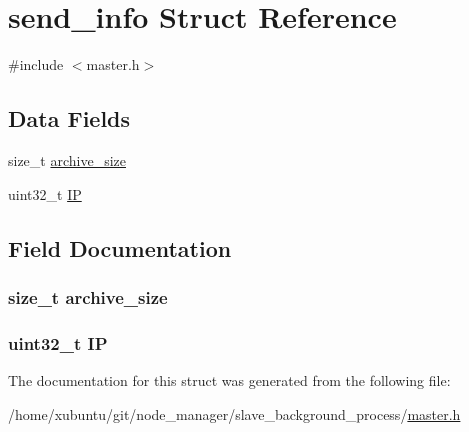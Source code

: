 \hypertarget{structsend__info}{}\section{send\+\_\+info Struct Reference}
\label{structsend__info}


{\ttfamily \#include $<$master.\+h$>$}

\subsection*{Data Fields}
\begin{DoxyCompactItemize}
\item 
size\+\_\+t \hyperlink{structsend__info_ab94e89f3b77835bdc3d4216184a99b60}{archive\+\_\+size}
\item 
uint32\+\_\+t \hyperlink{structsend__info_a7dfc7538cc29332ef7bb54fb8ff72ffc}{I\+P}
\end{DoxyCompactItemize}


\subsection{Field Documentation}
\hypertarget{structsend__info_ab94e89f3b77835bdc3d4216184a99b60}{}
\subsubsection[{archive\+\_\+size}]{\setlength{\rightskip}{0pt plus 5cm}size\+\_\+t archive\+\_\+size}\label{structsend__info_ab94e89f3b77835bdc3d4216184a99b60}
\hypertarget{structsend__info_a7dfc7538cc29332ef7bb54fb8ff72ffc}{}
\subsubsection[{I\+P}]{\setlength{\rightskip}{0pt plus 5cm}uint32\+\_\+t I\+P}\label{structsend__info_a7dfc7538cc29332ef7bb54fb8ff72ffc}


The documentation for this struct was generated from the following file\+:\begin{DoxyCompactItemize}
\item 
/home/xubuntu/git/node\+\_\+manager/slave\+\_\+background\+\_\+process/\hyperlink{master_8h}{master.\+h}\end{DoxyCompactItemize}
